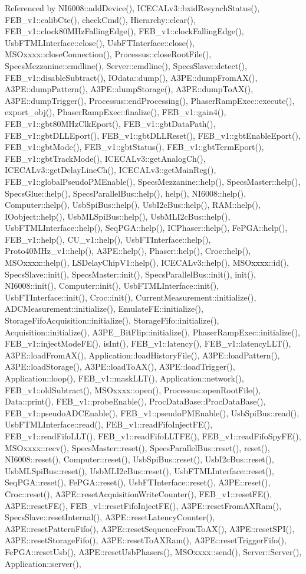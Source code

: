 Referenced by NI6008::addDevice(), ICECALv3::bxidResynchStatus(), FEB\_\-v1::calibCte(), checkCmd(), Hierarchy::clear(), FEB\_\-v1::clock80MHzFallingEdge(), FEB\_\-v1::clockFallingEdge(), UsbFTMLInterface::close(), UsbFTInterface::close(), MSOxxxx::closeConnection(), Processus::closeRootFile(), SpecsMezzanine::cmdline(), Server::cmdline(), SpecsSlave::detect(), FEB\_\-v1::disableSubtract(), IOdata::dump(), A3PE::dumpFromAX(), A3PE::dumpPattern(), A3PE::dumpStorage(), A3PE::dumpToAX(), A3PE::dumpTrigger(), Processus::endProcessing(), PhaserRampExec::execute(), export\_\-obj(), PhaserRampExec::finalize(), FEB\_\-v1::gain4(), FEB\_\-v1::gbt80MHzClkEport(), FEB\_\-v1::gbtDataPath(), FEB\_\-v1::gbtDLLEport(), FEB\_\-v1::gbtDLLReset(), FEB\_\-v1::gbtEnableEport(), FEB\_\-v1::gbtMode(), FEB\_\-v1::gbtStatus(), FEB\_\-v1::gbtTermEport(), FEB\_\-v1::gbtTrackMode(), ICECALv3::getAnalogCh(), ICECALv3::getDelayLineCh(), ICECALv3::getMainReg(), FEB\_\-v1::globalPseudoPMEnable(), SpecsMezzanine::help(), SpecsMaster::help(), SpecsGlue::help(), SpecsParallelBus::help(), help(), NI6008::help(), Computer::help(), UsbSpiBus::help(), UsbI2cBus::help(), RAM::help(), IOobject::help(), UsbMLSpiBus::help(), UsbMLI2cBus::help(), UsbFTMLInterface::help(), SeqPGA::help(), ICPhaser::help(), FePGA::help(), FEB\_\-v1::help(), CU\_\-v1::help(), UsbFTInterface::help(), Proto40MHz\_\-v1::help(), A3PE::help(), Phaser::help(), Croc::help(), MSOxxxx::help(), LSDelayChipV1::help(), ICECALv3::help(), MSOxxxx::id(), SpecsSlave::init(), SpecsMaster::init(), SpecsParallelBus::init(), init(), NI6008::init(), Computer::init(), UsbFTMLInterface::init(), UsbFTInterface::init(), Croc::init(), CurrentMeasurement::initialize(), ADCMeasurement::initialize(), EmulateFE::initialize(), StorageFifoAcquisition::initialize(), StorageFifo::initialize(), Acquisition::initialize(), A3PE\_\-BitFlip::initialize(), PhaserRampExec::initialize(), FEB\_\-v1::injectModeFE(), isInt(), FEB\_\-v1::latency(), FEB\_\-v1::latencyLLT(), A3PE::loadFromAX(), Application::loadHistoryFile(), A3PE::loadPattern(), A3PE::loadStorage(), A3PE::loadToAX(), A3PE::loadTrigger(), Application::loop(), FEB\_\-v1::maskLLT(), Application::network(), FEB\_\-v1::oldSubtract(), MSOxxxx::open(), Processus::openRootFile(), Data::print(), FEB\_\-v1::probeEnable(), ProcDataBase::ProcDataBase(), FEB\_\-v1::pseudoADCEnable(), FEB\_\-v1::pseudoPMEnable(), UsbSpiBus::read(), UsbFTMLInterface::read(), FEB\_\-v1::readFifoInjectFE(), FEB\_\-v1::readFifoLLT(), FEB\_\-v1::readFifoLLTFE(), FEB\_\-v1::readFifoSpyFE(), MSOxxxx::recv(), SpecsMaster::reset(), SpecsParallelBus::reset(), reset(), NI6008::reset(), Computer::reset(), UsbSpiBus::reset(), UsbI2cBus::reset(), UsbMLSpiBus::reset(), UsbMLI2cBus::reset(), UsbFTMLInterface::reset(), SeqPGA::reset(), FePGA::reset(), UsbFTInterface::reset(), A3PE::reset(), Croc::reset(), A3PE::resetAcquisitionWriteCounter(), FEB\_\-v1::resetFE(), A3PE::resetFE(), FEB\_\-v1::resetFifoInjectFE(), A3PE::resetFromAXRam(), SpecsSlave::resetInternal(), A3PE::resetLatencyCounter(), A3PE::resetPatternFifo(), A3PE::resetSequenceFromToAX(), A3PE::resetSPI(), A3PE::resetStorageFifo(), A3PE::resetToAXRam(), A3PE::resetTriggerFifo(), FePGA::resetUsb(), A3PE::resetUsbPhasers(), MSOxxxx::send(), Server::Server(), Application::server(), 
